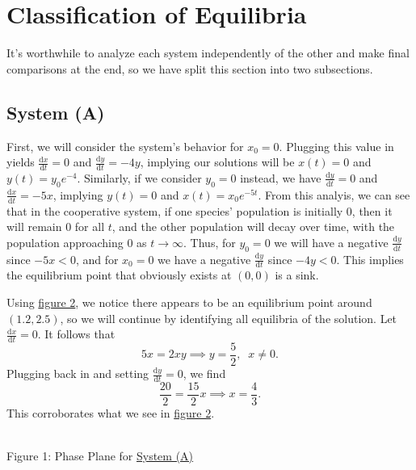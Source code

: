 \documentclass[11pt, letterpaper]{article}
\begin{document}
\section{Classification of Equilibria}\label{sec:2}
It's worthwhile to analyze each system independently of the other and make final comparisons at the end, so we have split this section into two subsections.
\subsection{System (A)}\label{sec:2a}
First, we will consider the system's behavior for $x_0=0$. Plugging this value in yields $\frac{\mathrm{d}x}{\mathrm{d}t} =0$ and $\frac{\mathrm{d}y}{\mathrm{d}t} =-4y$, implying our solutions will be $x(t)=0$ and $y(t)=y_0e^{-4}$. Similarly, if we consider $y_0=0$ instead, we have $\frac{\mathrm{d}y}{\mathrm{d}t} =0$ and $\frac{\mathrm{d}x}{\mathrm{d}t} =-5x$, implying $y(t)=0$ and $x(t)=x_0e^{-5t}$. From this analyis, we can see that in the cooperative system, if one species' population is initially 0, then it will remain 0 for all $t$, and the other population will decay over time, with the population approaching 0 as $t\to \infty$. Thus, for $y_0=0$ we will have a negative $\frac{\mathrm{d}y}{\mathrm{d}t} $ since $-5x<0$, and for $x_0=0$ we have a negative $\frac{\mathrm{d}y}{\mathrm{d}t} $ since $-4y<0$. This implies the equilibrium point that obviously exists at $(0,0)$ is a sink.

Using \hyperref[fig:1]{figure 2}, we notice there appears to be an equilibrium point around $(1.2,2.5)$, so we will continue by identifying all equilibria of the solution. Let $\frac{\mathrm{d}x}{\mathrm{d}t} =0$. It follows that
\[
	5x=2xy \implies y=\frac{5}{2},\;\; x\neq 0
.\]
Plugging back in and setting $\frac{\mathrm{d}y}{\mathrm{d}t} =0$, we find
\[
	\frac{20}{2}=\frac{15}{2}x\implies x=\frac{4}{3}
.\]
This corroborates what we see in \hyperref[fig:1]{figure 2}.
\begin{center}
	\\
	Figure 1: Phase Plane for \hyperref[sys]{System (A)}\label{fig:1}
\end{center}
\end{document}
